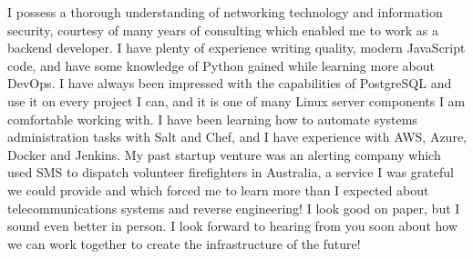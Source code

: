 \documentclass[11pt, letterpaper]{awesome-cv}
\begin{document}
\begin{cvletter}
I possess a thorough understanding of networking technology and information security, courtesy of many years of consulting which enabled me to work as a backend developer. I have plenty of experience writing quality, modern JavaScript code, and have some knowledge of Python gained while learning more about DevOps. I have always been impressed with the capabilities of PostgreSQL and use it on every project I can, and it is one of many Linux server components I am comfortable working with. I have been learning how to automate systems administration tasks with Salt and Chef, and I have experience with AWS, Azure, Docker and Jenkins. My past startup venture was an alerting company which used SMS to dispatch volunteer firefighters in Australia, a service I was grateful we could provide and which forced me to learn more than I expected about telecommunications systems and reverse engineering! I look good on paper, but I sound even better in person. I look forward to hearing from you soon about how we can work together to create the infrastructure of the future!

\end{cvletter}


\makeletterclosing
\end{document}
